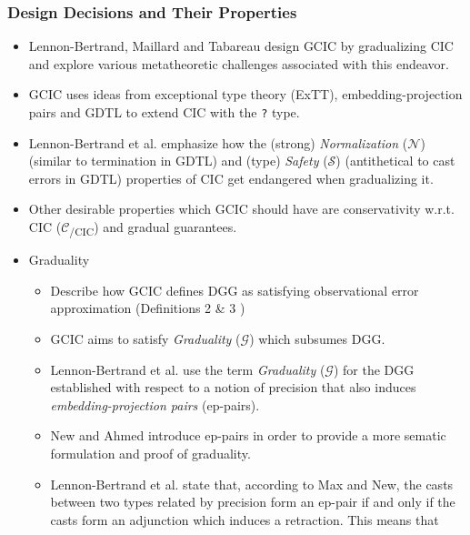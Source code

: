\documentclass{article}
\theoremstyle{definition}
\begin{document}
\subsubsection{Design Decisions and Their Properties}
\begin{itemize}
  \item Lennon-Bertrand, Maillard and
    Tabareau\cite{lennon-bertrand_gradualizing_2022} design GCIC by gradualizing
    CIC\cite{coquand_calculus_1988} and explore various metatheoretic challenges
    associated with this endeavor.
  \item GCIC uses ideas from exceptional type theory
    (ExTT)\cite{pedrot_failure_2018}, embedding-projection
    pairs\cite{new_graduality_2018} and
    GDTL\cite{eremondi_approximate_2019}\cite{eremondi_design_2023} to extend
    CIC with the \verb|?| type.
  \item Lennon-Bertrand et al.\cite{lennon-bertrand_gradualizing_2022} emphasize
    how the (strong) \textit{Normalization} (\(\mathcal{N}\)) (similar to
    termination in GDTL) and (type) \textit{Safety} (\(\mathcal{S}\))
    (antithetical to cast errors in GDTL) properties of CIC get endangered when
    gradualizing it.
  \item Other desirable properties which GCIC should have are conservativity w.r.t.
    CIC (\(\mathcal{C}\)\textsubscript{/CIC}) and gradual guarantees.
  \item Graduality
    \begin{itemize}
      \item Describe how GCIC defines DGG as satisfying observational error
        approximation (Definitions 2 \& 3
        \cite{lennon-bertrand_gradualizing_2022})
      \item GCIC aims to satisfy \textit{Graduality} (\(\mathcal{G}\)) which
        subsumes DGG.
      \item Lennon-Bertrand et al. use the term \textit{Graduality}
        (\(\mathcal{G}\)) for the DGG established with respect to a notion of
        precision that also induces \textit{embedding-projection pairs} (ep-pairs).
      \item New and Ahmed\cite{new_graduality_2018} introduce ep-pairs in order to
        provide a more sematic formulation and proof of graduality.
      \item Lennon-Bertrand et al. state that, according to Max and New, the casts
        between two types related by precision form an ep-pair if and only if the
        casts form an adjunction which induces a retraction. This means that

\end{itemize}
\end{itemize}
\end{document}
